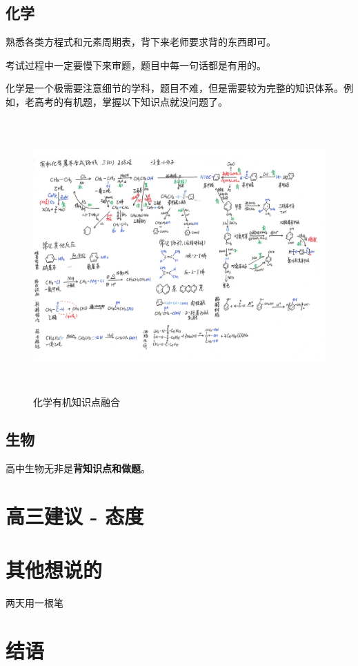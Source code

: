 \documentclass[UTF8,11pt,a4paper]{ctexart}
\begin{document}
		\subsection{化学}
			熟悉各类方程式和元素周期表，背下来老师要求背的东西即可。
			
			考试过程中一定要慢下来审题，题目中每一句话都是有用的。
			
			化学是一个极需要注意细节的学科，题目不难，但是需要较为完整的知识体系。例如，老高考的有机题，掌握以下知识点就没问题了。
			
			\begin{figure}[h]
				\centering
				\includegraphics[width=16cm,height=10.5cm]{2020-09-08_001.jpg}
				
				\caption{化学有机知识点融合}
			\end{figure}
		\subsection{生物}
			高中生物无非是\textbf{背知识点和做题}。
	\section{高三建议 - 态度}%
	
	\section{其他想说的}%
		两天用一根笔
	\section{结语}
\end{document}

